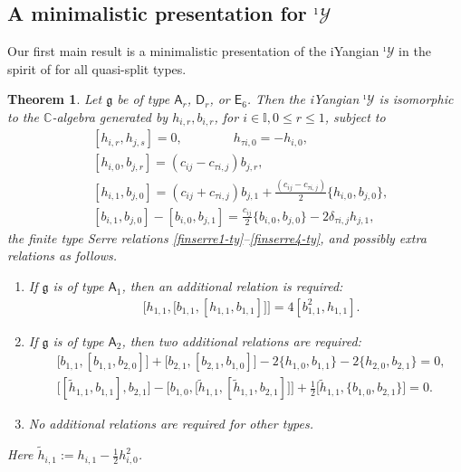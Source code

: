 \documentclass[11pt,reqno]{amsart}
\numberwithin{equation}{section}
\newtheorem{thm}{Theorem}[section]
\theoremstyle{definition}
\theoremstyle{remark}
\newcommand{\hf}{\tfrac12}
\newcommand{\g}{\mathfrak{g}}
\newcommand{\tl}{\tilde}
\newcommand{\lle}{\leqslant}
\newcommand{\Yi}{{^\imath\mathscr{Y}}}
\begin{document}
\subsection{A minimalistic presentation for $\Yi$}
Our first main result is a minimalistic presentation of the iYangian $\Yi$ in the spirit of \cite{Lev93gen,GNW18,Lu26min} for all quasi-split types.
\begin{thm}\label{thm:min}
Let $\g$ be of type $\mathsf A_{r}$, $\mathsf D_r$, or $\mathsf E_6$. Then the iYangian $\Yi$ is isomorphic to the $\mathbb{C}$-algebra generated by $h_{i,r},b_{i,r}$, for $i\in \mathbb{I},0\lle r\lle 1$, subject to
\begin{align}\label{redqs1}
& [h_{i,r},h_{j,s}]=0,\qquad\qquad  h_{\tau i,0}=-h_{i,0},
\\\label{redqs2}
& [h_{i,0},b_{j,r}]=  (c_{ij}-c_{\tau i,j}) b_{j,r},
\\\label{redqs3}
& [h_{i,1},b_{j,0}]=  (c_{ij}+c_{\tau i,j}) b_{j,1}+\frac{(c_{ij}-c_{\tau i,j})}{2}\{h_{i,0},b_{j,0}\},
\\\label{redqs5}
& [b_{i,1 },b_{j,0}]  - [b_{i,0 },b_{j,1 }] 
 =\frac{c_{ij}}{2}\{b_{i,0 },b_{j,0 }\}-2 \delta_{\tau i,j}h_{j,1 },
\end{align}
the finite type Serre relations \eqref{finserre1-ty}--\eqref{finserre4-ty}, and possibly extra relations as follows.
\begin{enumerate}
\item If $\g$ is of type $\mathsf A_1$, then an additional relation is required:
\begin{align}
&\big[h_{1,1},\big[b_{1,1},[h_{1,1},b_{1,1}]\big]\big]=4[b_{1,1}^2,h_{1,1}].\label{eq:extraA1}
\end{align}
\item If $\g$ is of type $\mathsf A_2$, then two additional relations are required:
\begin{align}
&\big[b_{1,1},[b_{1,1},b_{2,0}]\big]
+
\big[b_{2,1},[b_{2,1},b_{1,0}]\big]-2\{h_{1,0},b_{1,1}\}-2\{h_{2,0},b_{2,1}\}
=0,\label{eq:extraA2-1}\\
&\big[[\tl h_{1,1},b_{1,1}],b_{2,1}\big]-\big[b_{1,0},\big[\tl h_{1,1},[\tl h_{1,1},b_{2,1}]\big]\big]+\hf\big[\tl h_{1,1},\{b_{1,0},b_{2,1}\}\big]=0.\label{eq:extraA2-2}
\end{align}
\item No additional relations are required for other types.
\end{enumerate} 
Here $\tl h_{i,1}:=h_{i,1}-\hf h_{i,0}^2$.
\end{thm}
\end{document}
